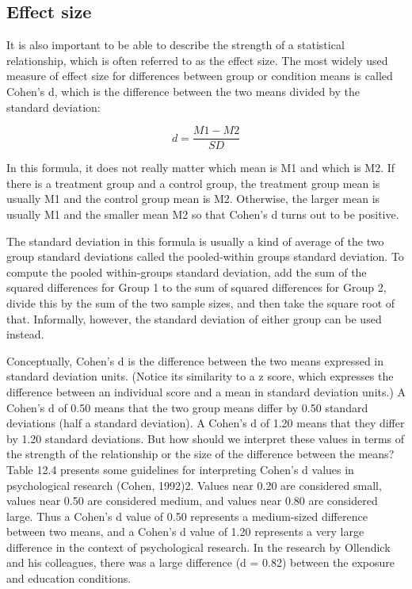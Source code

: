 \subsection{Effect size}
It is also important to be able to describe the strength of a statistical relationship, which is often referred to as the effect size. The most widely used measure of effect size for differences between group or condition means is called Cohen's d, which is the difference between the two means divided by the standard deviation:

\begin{equation}
d = \frac{M1 -M2}{SD}
\end{equation}

In this formula, it does not really matter which mean is M1 and which is M2. If there is a treatment group and
a control group, the treatment group mean is usually M1 and the control group mean is M2. Otherwise, the larger mean is usually M1 and the smaller mean M2 so that Cohen's d turns out to be positive.

The standard deviation in this formula is usually a kind of average of the two group standard deviations called the pooled-within groups standard deviation. To compute the pooled within-groups standard deviation, add the sum of the squared differences for Group 1 to the sum of squared differences for Group 2, divide this by the sum of the two sample sizes, and then take the square root of that. Informally, however, the standard deviation of either group can be used instead.


 Conceptually, Cohen's d is the difference between the two means expressed in standard deviation units. (Notice its similarity to a z score, which expresses the difference between an individual score and a mean in standard deviation units.) A Cohen's d of 0.50 means that the two group means differ by 0.50 standard deviations (half a standard deviation). A Cohen's d of 1.20 means that they differ by 1.20 standard deviations. But how should we interpret these values in terms of the strength of the relationship or the size of the difference between the means? Table 12.4 presents some guidelines for interpreting Cohen's d values in psychological research (Cohen, 1992)2. Values near 0.20 are considered small, values near 0.50 are considered medium, and values near 0.80 are considered large. Thus a Cohen's d value of 0.50 represents a medium-sized difference between two means, and a Cohen's d value of 1.20 represents a very large difference in the context of psychological research. In the research by Ollendick and his colleagues, there was a large difference (d = 0.82) between the exposure and education conditions.


